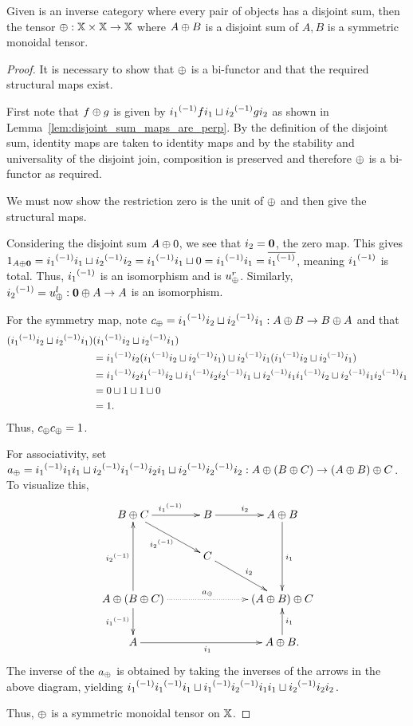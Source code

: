 \begin{proposition}\label{prop:enough_disjoint_sums_make_a_symmetrict_monoidal_tensor}
  Given \X is an inverse category where every pair of objects has a disjoint sum, then the tensor
  $\oplus:\mathbb{X}\times \mathbb{X} \to \mathbb{X}$ where $A\oplus B$ is a disjoint sum of $A,B$ is a symmetric monoidal tensor.
\end{proposition}
\begin{proof}
  It is necessary to show that $\oplus$ is a bi-functor and that the required structural maps exist.

  First note that $f\oplus g$ is given by ${i_1}^{(-1)} f i_1 \sqcup {i_2}^{(-1)} g i_2$ as shown in
  Lemma~\ref{lem:disjoint_sum_maps_are_perp}. By the definition of the disjoint sum, identity maps
  are taken to identity maps and by the stability and universality of the disjoint join, composition
  is preserved and therefore $\oplus$ is a bi-functor as required.

  We must now show the restriction zero is the unit of $\oplus$ and then give the structural maps.

  Considering the disjoint sum $A\oplus0$, we see that $i_2 = \mathbf{0}$, the zero map. This gives
  $1_{A\oplus\mathbf{0}}  = {i_1}^{(-1)}i_1 \sqcup {i_2}^{(-1)}i_2 = {i_1}^{(-1)}i_1 \sqcup 0 = {i_1}^{(-1)}i_1 =
    \overline{{i_1}^{(-1)}}$, meaning ${i_1}^{(-1)}$ is total. Thus, ${i_1}^{(-1)}$ is an isomorphism and is
  $u_{\oplus}^r$. Similarly, ${i_2}^{(-1)} = u_{\oplus}^l:\mathbf{0}\oplus A \to A$ is an isomorphism.

  For the symmetry map, note $c_\oplus = {i_1}^{(-1)}i_2 \sqcup {i_2}^{(-1)}i_1: A\oplus B \to B\oplus A$ and that
  \begin{align*}
    ({i_1}^{(-1)}i_2 \sqcup {i_2}^{(-1)}i_1)&({i_1}^{(-1)}i_2 \sqcup {i_2}^{(-1)}i_1)\\
    &={i_1}^{(-1)}i_2({i_1}^{(-1)}i_2
    \sqcup {i_2}^{(-1)}i_1) \sqcup {i_2}^{(-1)}i_1({i_1}^{(-1)}i_2 \sqcup {i_2}^{(-1)}i_1)\\
    &={i_1}^{(-1)}i_2{i_1}^{(-1)}i_2 \sqcup {i_1}^{(-1)}i_2{i_2}^{(-1)}i_1 \sqcup {i_2}^{(-1)}i_1{i_1}^{(-1)}i_2
    \sqcup {i_2}^{(-1)}i_1{i_2}^{(-1)}i_1\\
    & = 0 \sqcup 1 \sqcup 1 \sqcup 0 \\
    & = 1.
  \end{align*}
  Thus, $c_\oplus c_\oplus =1$.

  For associativity, set $a_\oplus = {i_1}^{(-1)}i_1i_1 \sqcup {i_2}^{(-1)}{i_1}^{(-1)}i_2i_1 \sqcup {i_2}^{(-1)}
  {i_2}^{(-1)} i_2:A\oplus(B\oplus C) \to (A\oplus B)\oplus C$.
  To visualize this,
  \[
    \xymatrix@C+5pt{
      B\+C \ar[r]^{\inv{i_1}} \ar[dr]_{\inv{i_2}}
        & B \ar[r]^{i_2}
        & A\+B \ar[dd]^{i_1}\\
      & C \ar[dr]^{i_2} & \\
      A\+(B\+C)\ar[uu]^{\inv{i_2}} \ar[d]_{\inv{i_1}} \ar@{.>}[rr]^{a_{\+}} && (A\+B)\+C \\
      A \ar[rr]_{i_1} & & A\+B. \ar[u]_{i_1}
    }
  \]
  The inverse of the $a_\oplus$ is obtained by taking the inverses of the arrows in the above diagram,
  yielding ${i_1}^{(-1)}{i_1}^{(-1)}i_1 \sqcup {i_1}^{(-1)}{i_2}^{(-1)}i_1i_1 \sqcup {i_2}^{(-1)}i_2 i_2$.

  Thus, $\oplus$ is a symmetric monoidal tensor on $\mathbb{X}$.
\end{proof}



